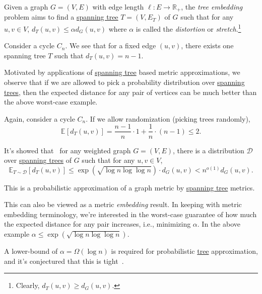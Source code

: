 \begin{problem}\label{prb:tree-embedding}
Given a graph \(G=(V, E)\) with edge length \(\ell \colon E \to \mathbb{R} _+\), the \emph{tree embedding} problem aims to find a \hyperref[def:spanning-tree]{spanning tree} \(T = (V, E_T)\) of \(G\) such that for any \(u, v \in V\), \(d_T(u, v) \leq \alpha d_G(u, v)\) where \(\alpha \) is called the \emph{distortion} or \emph{stretch}.\footnote{Clearly, \(d_T(u, v) \geq d_G(u, v)\).}
\end{problem}

\begin{eg}[Cycle]
  Consider a cycle \(C_n\). We see that for a fixed edge \((u, v)\), there exists one spanning tree \(T\) such that \(d_T(u, v) = n - 1\).
\end{eg}

Motivated by applications of \hyperref[def:spanning-tree]{spanning tree} based metric approximations, we observe that if we are allowed to pick a probability distribution over \hyperref[def:spanning-tree]{spanning trees}, then the expected distance for any pair of vertices can be much better than the above worst-case example.

\begin{eg}[Cycle]
  Again, consider a cycle \(C_n\). If we allow randomization (picking trees randomly),
  \[
    \mathbb{E}_{}[d_T(u, v)]
    = \frac{n-1}{n} \cdot 1 + \frac{1}{n} \cdot (n-1)
    \leq 2.
  \]
\end{eg}

It's showed that~\cite{alon1995graph} for any weighted graph \(G = (V, E)\), there is a distribution \(\mathcal{D} \) over \hyperref[def:spanning-tree]{spanning trees} of \(G\) such that for any \(u, v \in V\),
\[
  \mathbb{E}_{T \sim \mathcal{D} }[d_T(u, v)]
  \leq \exp (\sqrt{\log n \log \log n} ) \cdot d_G(u, v)
  < n^{o(1)} d_G(u, v).
\]

\begin{intuition}
  This is a probabilistic approximation of a graph metric by \hyperref[def:spanning-tree]{spanning tree} metrics.
\end{intuition}

This can also be viewed as a metric \emph{embedding} result. In keeping with metric embedding terminology, we're interested in the worst-case guarantee of how much the expected distance for any pair increases, i.e., minimizing \(\alpha \). In the above example \(\alpha \leq \exp (\sqrt{\log n \log \log n} )\).

\begin{note}
  A lower-bound of \(\alpha = \Omega (\log n)\) is required for probabilistic \hyperref[def:spanning-tree]{tree} approximation, and it's conjectured that this is tight~\cite{alon1995graph}.
\end{note}

